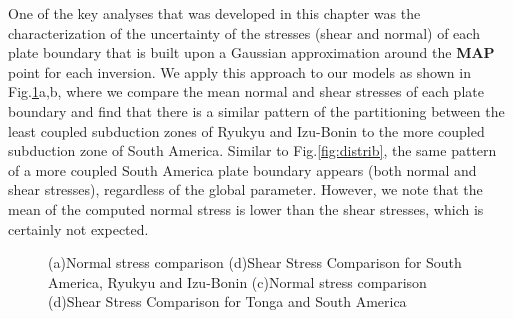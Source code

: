 \documentclass[12pt]{article}
\begin{document}
One of the key analyses that was developed in this chapter was the characterization of the uncertainty of the stresses (shear and normal) of each plate boundary that is built upon a Gaussian approximation around the \textbf{MAP} point for each inversion. We apply this approach to our models as shown in Fig.\ref{fig:shear_smaller}a,b, where we compare the mean normal and shear stresses of each plate boundary and find that there is a similar pattern of the partitioning between the least coupled subduction zones of Ryukyu and Izu-Bonin to the more coupled subduction zone of South America. Similar to Fig.\ref{fig:distrib}, the same pattern of a more coupled South America plate boundary appears (both normal and shear stresses), regardless of the global parameter. However, we note that the mean of the computed normal stress is lower than the shear stresses, which is certainly not expected.

\begin{figure}[H]
\centering
\hspace{-0.2cm}
\hspace{-0.2cm}
\hspace{-0.2cm}
\hspace{-0.2cm}
\caption{(a)Normal stress comparison (d)Shear Stress Comparison for South America, Ryukyu and Izu-Bonin (c)Normal stress comparison (d)Shear Stress Comparison for Tonga and South America}
\label{fig:shear_smaller}
\end{figure}
\end{document}
